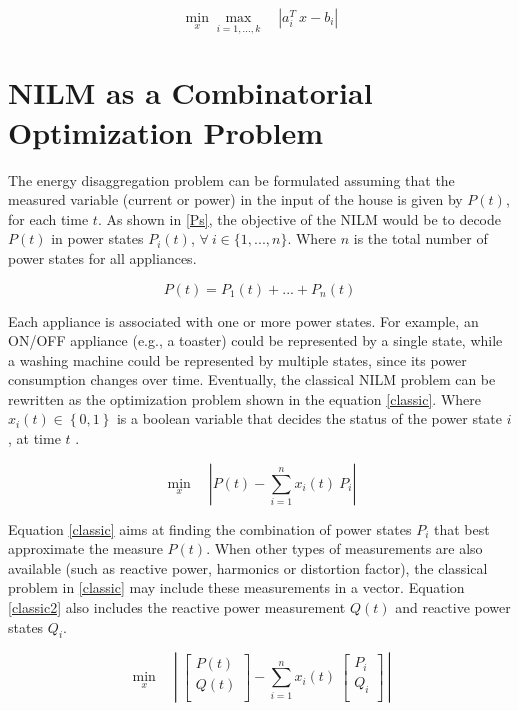 \begin{equation} \label{chebyshev}
    \min_{x} \max_{i=1,...,k} \quad \left| a_i^T\ x - b_i \right |
\end{equation}

\section{NILM as a Combinatorial Optimization Problem}

The energy disaggregation problem can be formulated assuming that the measured variable (current or power) in the input of the house is given by $P(t)$, for each time $t$. As shown in \eqref{Ps}, the objective of the NILM would be to decode $P(t)$ in power states $P_i(t)$, $\forall \ i \in \{1,...,n\}$. Where $n$ is the total number of power states for all appliances. 

\begin{equation} \label{Ps}
    P(t) = P_1(t) + ... + P_n(t)
\end{equation}
 
Each appliance is associated with one or more power states. For example, an ON/OFF appliance (e.g., a toaster) could be represented by a single state, while a washing machine could be represented by multiple states, since its power consumption changes over time. 
Eventually, the classical NILM problem can be rewritten as the optimization problem shown in the equation \eqref{classic}. Where $x_i(t) \in \left\{ 0 , 1 \right\}$ is a boolean variable that decides the status of the power state $i$, at time $t$ \cite{hart}.

\begin{equation} \label{classic}
    \min_{x} \quad \left| P(t) - \sum_{i=1}^{n} x_i(t)\ P_i \right |
\end{equation}

Equation \eqref{classic} aims at finding the combination of power states $P_i$ that best approximate the measure $P(t)$. When other types of measurements are also available (such as reactive power, harmonics or distortion factor), the classical problem in \eqref{classic} may include these measurements in a vector. Equation \eqref{classic2} also includes the reactive power measurement $Q(t)$ and reactive power states $Q_i$. 

\begin{equation} \label{classic2}
    \min_{x} \quad \left|\ \begin{bmatrix}
         P(t) \\
         Q(t) \\
        \end{bmatrix} - \sum_{i=1}^{n} x_i(t)\ \begin{bmatrix}
         P_i \\
         Q_i \\
        \end{bmatrix} \ \right|
\end{equation}

